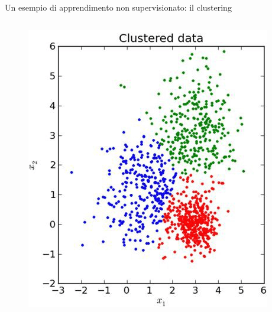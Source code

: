 \begin{frame}
\begin{block}{Un esempio di apprendimento non supervisionato: il clustering}
\begin{columns}
			\begin{figure}[!htbp]
				\centering
				\includegraphics[width=1.0\linewidth]{images/glossary/unsupervised_learning_2_2.png}
			\end{figure}	
		\end{columns}

	\end{block}

\end{frame}


